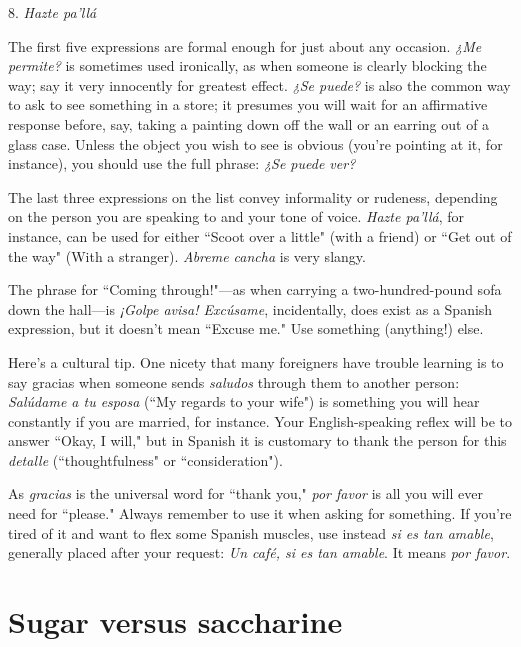 8. \emph{Hazte pa'llá}

\bsk

The first five expressions are formal enough for just about any occasion. \emph{¿Me permite?} is sometimes used ironically, as when someone is
clearly blocking the way; say it very innocently for greatest effect. \emph{¿Se
	puede?} is also the common way to ask to see something in a store; it
presumes you will wait for an affirmative response before, say, taking a
painting down off the wall or an earring out of a glass case. Unless the
object you wish to see is obvious (you're pointing at it, for instance),
you should use the full phrase: \emph{¿Se puede ver?}

The last three expressions on the list convey informality or
rudeness, depending on the person you are speaking to and your
tone of voice. \emph{Hazte pa'llá}, for instance, can be used for either ``Scoot
over a little" (with a friend) or ``Get out of the way" (With a stranger).
\emph{Abreme cancha} is very slangy.

The phrase for ``Coming through!"---as when carrying a two-hundred-pound sofa down the hall---is \emph{¡Golpe avisa! Excúsame}, incidentally, does exist as a Spanish expression, but it doesn't mean ``Excuse me." Use something (anything!) else.

Here's a cultural tip. One nicety that many foreigners
have trouble learning is to say gracias when someone sends \emph{saludos}
through them to another person: \emph{Salúdame a tu esposa} (``My regards to your wife") is something you will hear constantly if you are
married, for instance. Your English-speaking reflex will be to answer
``Okay, I will," but in Spanish it is customary to thank the person for
this \emph{detalle} (``thoughtfulness" or ``consideration").

As \emph{gracias} is the universal word for ``thank you," \emph{por favor} is
all you will ever need for ``please." Always remember to use it when
asking for something. If you're tired of it and want to flex some Spanish muscles, use instead \emph{si es tan amable}, generally placed after your
request: \emph{Un café, si es tan amable}. It means \emph{por favor}.

\section{Sugar versus saccharine}

